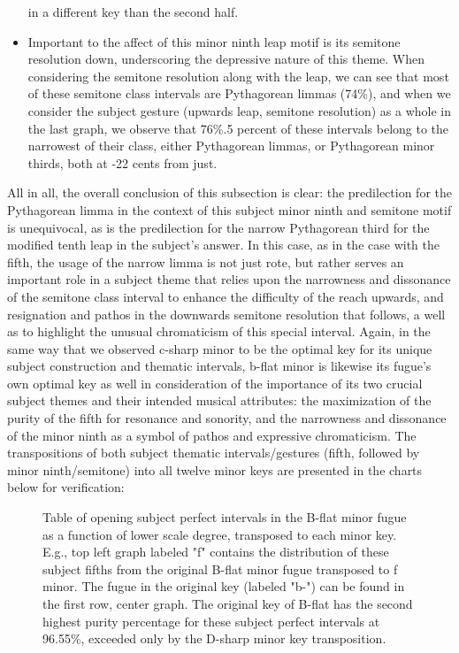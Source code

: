 \begin{itemize}
  in a different key than the second half.
\item
  Important to the affect of this minor ninth leap motif is its semitone
  resolution down, underscoring the depressive nature of this theme.
  When considering the semitone resolution along with the leap, we can
  see that most of these semitone class intervals are Pythagorean limmas
  (74\%), and when we consider the subject gesture (upwards leap,
  semitone resolution) as a whole in the last graph, we observe that
  76\%.5 percent of these intervals belong to the narrowest of their
  class, either Pythagorean limmas, or Pythagorean minor thirds, both at
  -22 cents from just.
\end{itemize}

All in all, the overall conclusion of this subsection is clear: the
predilection for the Pythagorean limma in the context of this subject
minor ninth and semitone motif is unequivocal, as is the predilection
for the narrow Pythagorean third for the modified tenth leap in the
subject's answer. In this case, as in the case with the fifth, the usage
of the narrow limma is not just rote, but rather serves an important
role in a subject theme that relies upon the narrowness and dissonance
of the semitone class interval to enhance the difficulty of the reach
upwards, and resignation and pathos in the downwards semitone resolution
that follows, a well as to highlight the unusual chromaticism of this
special interval. Again, in the same way that we observed c-sharp minor
to be the optimal key for its unique subject construction and thematic
intervals, b-flat minor is likewise its fugue's own optimal key as well
in consideration of the importance of its two crucial subject themes and
their intended musical attributes: the maximization of the purity of the
fifth for resonance and sonority, and the narrowness and dissonance of
the minor ninth as a symbol of pathos and expressive chromaticism. The
transpositions of both subject thematic intervals/gestures (fifth,
followed by minor ninth/semitone) into all twelve minor keys are
presented in the charts below for verification:



\begin{figure}[H]
\vspace{1.5em}
    \centering
    \caption[Table of opening subject perfect intervals in the B-flat minor fugue as a function of lower scale degree, transposed to each minor key. ]{Table of opening subject perfect intervals in the B-flat minor fugue as a function of lower scale degree, transposed to each minor key. E.g., top left graph labeled "f" contains the distribution of these subject fifths from the original B-flat minor fugue transposed to f minor. The fugue in the original key (labeled "b-") can be found in the first row, center graph. The original key of B-flat has the second highest purity percentage for these subject perfect intervals at 96.55\%, exceeded only by the D-sharp minor key transposition.}
\end{figure}

